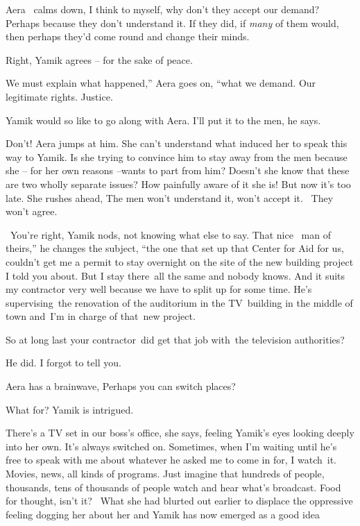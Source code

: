 \documentclass[letterpaper]{article}
\begin{document}
Aera \ calms down, {\textquotedbl}I think to myself, why don't they accept our demand? Perhaps because they don't
understand it. If they did, if \textit{many} of them would, then perhaps they'd come round and change their
minds.{\textquotedbl} 

{\textquotedbl}Right,{\textquotedbl} Yamik agrees -- for the sake of peace.

{\textquotedbl}We must explain what happened,'' Aera goes on, ``what we demand. Our legitimate rights.
Justice.{\textquotedbl} 

Yamik would so like to go along with Aera. {\textquotedbl}I'll put it to the men,{\textquotedbl} he says.

{\textquotedbl}Don't!{\textquotedbl} Aera jumps at him. She can't understand what induced her to speak this way to
Yamik. Is she trying to convince him to stay away from the men because she -- for her own reasons --wants to part from
him? Doesn't she know that these are two wholly separate issues? How painfully aware of it she is! But now it's too
late. She rushes ahead, {\textquotedbl}The men won't understand it, won't accept it.~ They won't agree.{\textquotedbl} 

~{\textquotedbl}You're right,{\textquotedbl} Yamik nods, not knowing what else to say. {\textquotedbl}That nice \ man of
theirs,'' he changes the subject, ``the one that set up that Center for Aid for us, couldn't get me a permit to stay
overnight on the site of the new building project I told you about. But I stay there~all the same and nobody knows. And
it suits my contractor very well because we have to split up for some time. He's supervising~the renovation of the
auditorium in the TV~building in the middle of town and~I'm in charge of that~new project.{\textquotedbl} 

{\textquotedbl}So at long last your contractor~did get that job with~the television authorities?{\textquotedbl} 

{\textquotedbl}He did. I forgot to tell you.{\textquotedbl} 

Aera has a brainwave, {\textquotedbl}Perhaps you can switch places?{\textquotedbl} 

{\textquotedbl}What for?{\textquotedbl} Yamik is intrigued.

{\textquotedbl}There's a TV set in our boss's office,{\textquotedbl} she says, feeling Yamik's eyes looking deeply into
her own. {\textquotedbl}It's always switched on. Sometimes, when I'm waiting until he's free to speak with me about
whatever he asked me to come in for, I watch~it. Movies, news, all kinds of programs. Just imagine that hundreds of
people, thousands, tens of thousands of people watch and hear what's broadcast. Food for thought, isn't
it?{\textquotedbl}~ What she had blurted out earlier to displace the oppressive feeling dogging her about her and Yamik
has now emerged as a good idea
\end{document}
